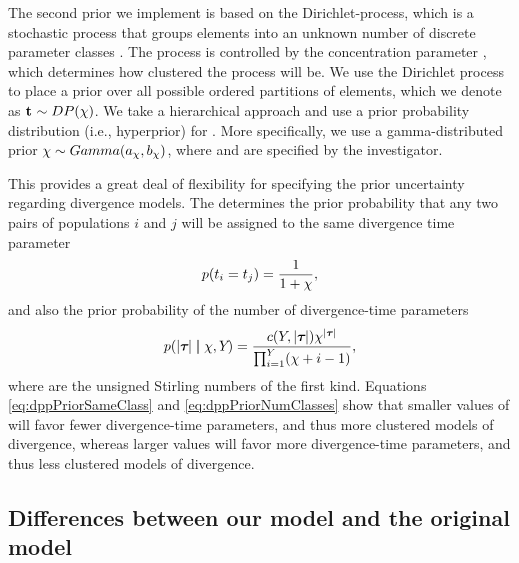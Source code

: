 The second prior we implement is based on the Dirichlet-process, which is a
stochastic process that groups elements into an unknown number of discrete
parameter classes \citep{Ferguson1973,Antoniak1974}.
The process is controlled by the concentration parameter \concentrationParam,
which determines how clustered the process will be.
We use the Dirichlet process to place a prior over all possible ordered
partitions of \npairs{} elements, which we denote as $\mathbf{t_{}} \sim
DP(\chi )$.
We take a hierarchical approach and use a prior probability
distribution (i.e., hyperprior) for \concentrationParam.
More specifically, we use a gamma-distributed prior $\chi \sim
Gamma(a_{\chi}, b_{\chi})$,
where \gammaShape{\concentrationParam} and \gammaScale{\concentrationParam} are
specified by the investigator.

\begin{linenomath}
This provides a great deal of flexibility for specifying the prior uncertainty
regarding divergence models.
The \concentrationParam determines the prior probability that any two
pairs of populations $i$ and $j$ will be assigned to the same divergence time
parameter
\begin{equation}
    p(t_{i} = t_{j}) = \frac{1}{1 + \chi},
    \label{eq:dppPriorSameClass}
\end{equation}
and also the prior probability of the number of divergence-time parameters
\begin{equation}
    p(\lvert \boldsymbol{\tau_{}} \rvert \boldsymbol{\mid} \chi, Y_{}) = 
    \frac{c(Y_{}, \lvert \boldsymbol{\tau_{}} \rvert) \chi^{\lvert \boldsymbol{\tau_{}} \rvert}}
    {\prod_{i=1}^{Y_{}}(\chi + i - 1)},
    \label{eq:dppPriorNumClasses}
\end{equation}
where \stirlingFirst{\cdot}{\cdot} are the unsigned Stirling numbers of the
first kind.
Equations \ref{eq:dppPriorSameClass} and \ref{eq:dppPriorNumClasses} show that
smaller values of \concentrationParam will favor fewer divergence-time
parameters, and thus more clustered models of divergence, whereas larger values
will favor more divergence-time parameters, and thus less clustered models of
divergence.
\end{linenomath}

\subsection*{Differences between our model and the original \msb model}
